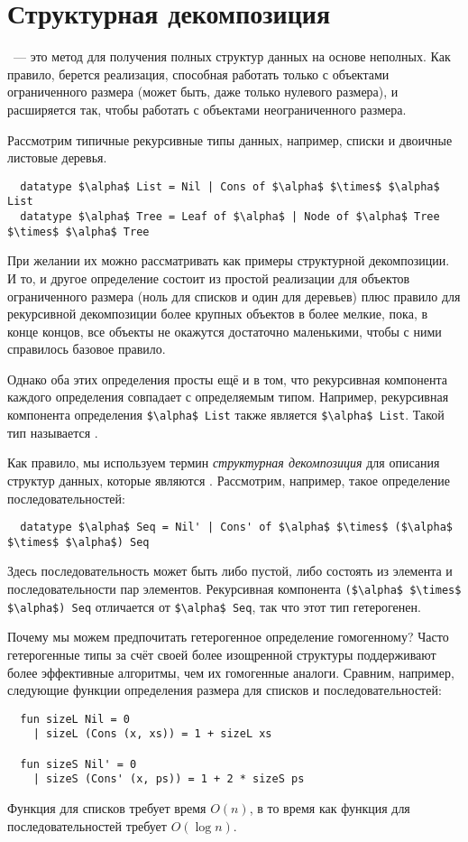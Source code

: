 \section{Структурная декомпозиция}
\label{sc:10.1}

~--- это
метод для получения полных структур данных на основе неполных.  Как
правило, берется реализация, способная работать только с объектами
ограниченного размера (может быть, даже только нулевого размера), и
расширяется так, чтобы работать с объектами неограниченного размера.

Рассмотрим типичные рекурсивные типы данных, например, списки и
двоичные листовые деревья.
\begin{lstlisting}
  datatype $\alpha$ List = Nil | Cons of $\alpha$ $\times$ $\alpha$ List
  datatype $\alpha$ Tree = Leaf of $\alpha$ | Node of $\alpha$ Tree $\times$ $\alpha$ Tree
\end{lstlisting}
При желании их можно рассматривать как примеры структурной
декомпозиции. И то, и другое определение состоит из простой реализации
для объектов ограниченного размера (ноль для списков и один для
деревьев) плюс правило для рекурсивной декомпозиции более крупных
объектов в более мелкие, пока, в конце концов, все объекты не окажутся
достаточно маленькими, чтобы с ними справилось базовое правило.

Однако оба этих определения просты ещё и в том, что рекурсивная
компонента каждого определения совпадает с определяемым
типом. Например, рекурсивная компонента определения
\lstinline!$\alpha$ List! также является \lstinline!$\alpha$ List!. 
Такой тип называется .

Как правило, мы используем термин \emph{структурная декомпозиция} для
описания структур данных, которые являются
. Рассмотрим, например, такое
определение последовательностей:
\begin{lstlisting}
  datatype $\alpha$ Seq = Nil' | Cons' of $\alpha$ $\times$ ($\alpha$ $\times$ $\alpha$) Seq
\end{lstlisting}
Здесь последовательность может быть либо пустой, либо состоять из
элемента и последовательности пар элементов. Рекурсивная компонента
\lstinline!($\alpha$ $\times$ $\alpha$) Seq! отличается от
\lstinline!$\alpha$ Seq!, так что этот тип гетерогенен.

Почему мы можем предпочитать гетерогенное определение гомогенному?
Часто гетерогенные типы за счёт своей более изощренной структуры поддерживают
более эффективные алгоритмы, чем их гомогенные аналоги. Сравним,
например, следующие функции определения размера для списков и
последовательностей:
\begin{lstlisting}
  fun sizeL Nil = 0
    | sizeL (Cons (x, xs)) = 1 + sizeL xs

  fun sizeS Nil' = 0
    | sizeS (Cons' (x, ps)) = 1 + 2 * sizeS ps
\end{lstlisting}
Функция для списков требует время $O(n)$, в то время как функция для
последовательностей требует $O(\log n)$.

